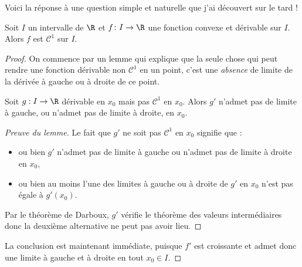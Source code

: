 \documentclass{notes}
\begin{document}

Voici la réponse à une question simple et naturelle que j'ai découvert sur le tard !

\begin{theo*}
  Soit $I$ un intervalle de $\R$ et $f\colon I\to \R$ une fonction convexe et dérivable sur $I$. Alors $f$ est $\mathcal{C}^{1}$ sur $I$.
\end{theo*}

\begin{proof}
  On commence par un lemme qui explique que la seule chose qui peut rendre une fonction dérivable non $\mathcal{C}^{1}$ en un point, c'est une \emph{absence} de limite de la dérivée à gauche ou à droite de ce point.
  \begin{lemm*}
    Soit $g:I\to \R$ dérivable en $x_0$ mais pas $\mathcal{C}^{1}$ en $x_0$. Alors $g'$ n'admet pas de limite à gauche, ou n'admet pas de limite à droite, en $x_0$.
  \end{lemm*}
  \begin{proof}[Preuve du lemme]
    Le fait que $g'$ ne soit pas $\mathcal{C}^{1}$ en $x_0$ signifie que :
    \begin{itemize}
      \item ou bien $g'$ n'admet pas de limite à gauche ou n'admet pas de limite à droite en $x_0$,
      \item ou bien au moins l'une des limites à gauche ou à droite de $g'$ en $x_0$ n'est pas égale à $g'(x_0)$.
    \end{itemize}
    Par le théorème de Darboux, $g'$ vérifie le théorème des valeurs intermédiaires donc la deuxième alternative ne peut pas avoir lieu.
  \end{proof}

  La conclusion est maintenant immédiate, puisque $f'$ est croissante et admet donc une limite à gauche et à droite en tout $x_0\in I$.

\end{proof}



 
\end{document}
